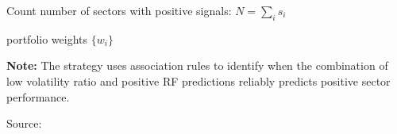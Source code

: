 \begin{algorithm}[H]
{        Count number of sectors with positive signals: $N = \sum_{i} s_i$\;
        
        
        \Return portfolio weights $\{w_i\}$\;
    }

    \textbf{Note:} The strategy uses association rules to identify when the combination of low volatility ratio and positive RF predictions reliably predicts positive sector performance.

    Source: \cite{simonian_2019}
\end{algorithm}








